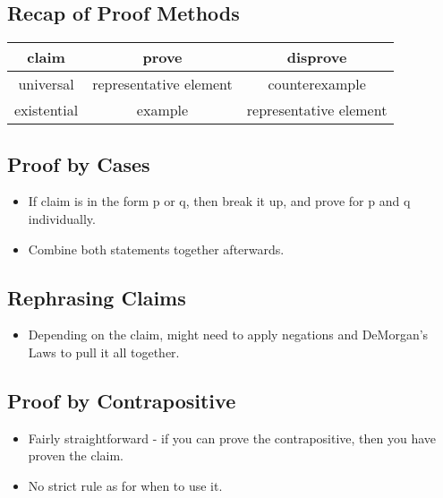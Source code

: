\subsection{Recap of Proof Methods}
\begin{tabular}[!ht]{c|c|c}
    claim & prove & disprove\\ \hline
    universal & representative element & counterexample\\ 
    existential & example & representative element\\    
\end{tabular}


\subsection{Proof by Cases}
\begin{itemize}
    \item If claim is in the form p or q, then break it up, and prove for p and q individually.
    \item Combine both statements together afterwards.
\end{itemize}

\subsection{Rephrasing Claims}
\begin{itemize}
    \item Depending on the claim, might need to apply negations and DeMorgan's Laws to pull it all together.
\end{itemize}

\subsection{Proof by Contrapositive}
\begin{itemize}
    \item Fairly straightforward - if you can prove the contrapositive, then you have proven the claim.
    \item No strict rule as for when to use it.
\end{itemize}